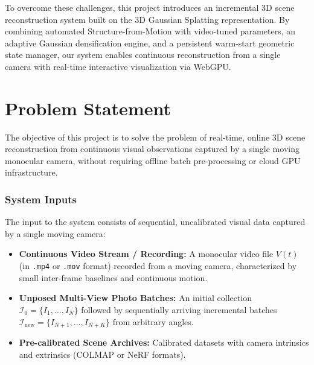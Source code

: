 \documentclass[conference]{IEEEtran}
\begin{document}
To overcome these challenges, this project introduces an incremental 3D scene reconstruction system built on the 3D Gaussian Splatting representation. By combining automated Structure-from-Motion with video-tuned parameters, an adaptive Gaussian densification engine, and a persistent warm-start geometric state manager, our system enables continuous reconstruction from a single camera with real-time interactive visualization via WebGPU.

\section{Problem Statement}
The objective of this project is to solve the problem of real-time, online 3D scene reconstruction from continuous visual observations captured by a single moving monocular camera, without requiring offline batch pre-processing or cloud GPU infrastructure.

\subsubsection{System Inputs}
The input to the system consists of sequential, uncalibrated visual data captured by a single moving camera:
\begin{itemize}
    \item \textbf{Continuous Video Stream / Recording:} A monocular video file $V(t)$ (in \texttt{.mp4} or \texttt{.mov} format) recorded from a moving camera, characterized by small inter-frame baselines and continuous motion.
    \item \textbf{Unposed Multi-View Photo Batches:} An initial collection $\mathcal{I}_0 = \{I_1, \dots, I_N\}$ followed by sequentially arriving incremental batches $\mathcal{I}_{\text{new}} = \{I_{N+1}, \dots, I_{N+K}\}$ from arbitrary angles.
    \item \textbf{Pre-calibrated Scene Archives:} Calibrated datasets with camera intrinsics and extrinsics (COLMAP or NeRF formats).
\end{itemize}
\end{document}
